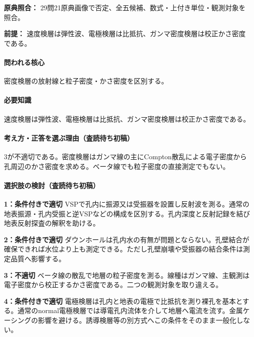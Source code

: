 \noindent\textbf{原典照合：} 29問21原典画像で否定、全五候補、数式・上付き単位・観測対象を照合。\par

\noindent\textbf{前提：} 速度検層は弾性波、電極検層は比抵抗、ガンマ密度検層は校正かさ密度である。\par

\paragraph{問われる核心} 密度検層の放射線と粒子密度・かさ密度を区別する。

\paragraph{必要知識} 速度検層は弾性波、電極検層は比抵抗、ガンマ密度検層は校正かさ密度である。

\paragraph{考え方・正答を選ぶ理由（査読待ち初稿）} 3が不適切である。密度検層はガンマ線の主にCompton散乱による電子密度から孔周辺のかさ密度を求める。ベータ線でも粒子密度の直接測定でもない。

\paragraph{選択肢の検討（査読待ち初稿）}\mbox{}\par

\noindent\textbf{1：条件付きで適切} VSPで孔内に振源又は受振器を設置し反射波を測る。通常の地表振源・孔内受振と逆VSPなどの構成を区別する。孔内深度と反射記録を結び地表反射探査の解釈を助ける。\par

\noindent\textbf{2：条件付きで適切} ダウンホールは孔内水の有無が問題とならない。孔壁結合が確保できれば水位より上も測定できる。ただし孔壁崩壊や受振器の結合条件は測定品質へ影響する。\par

\noindent\textbf{3：不適切} ベータ線の散乱で地層の粒子密度を測る。線種はガンマ線、主観測は電子密度から校正するかさ密度である。二つの観測対象を取り違える。\par

\noindent\textbf{4：条件付きで適切} 電極検層は孔内と地表の電極で比抵抗を測り裸孔を基本とする。通常のnormal電極検層では導電孔内流体を介して地層へ電流を流す。金属ケーシングの影響を避ける。誘導検層等の別方式へこの条件をそのまま一般化しない。\par

